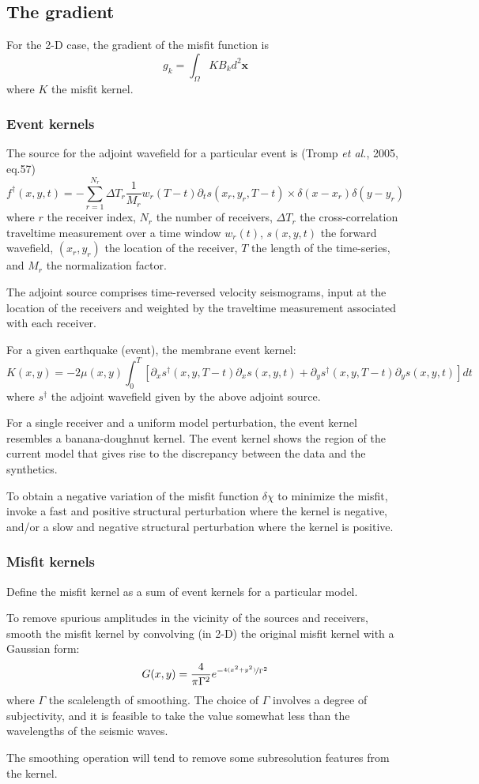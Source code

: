 \documentclass{article}
\newcommand{\mbf}[1]{\mathbf{#1}}
\newcommand{\etal}{\textit{et al.}}
\begin{document}
\subsection{The gradient}
For the 2-D case, the gradient of the misfit function is
\[ g_k=\int_\Omega KB_kd^2\mbf x \]
where $K$ the misfit kernel.\par
\subsubsection{Event kernels}
The source for the adjoint wavefield for a particular event is (Tromp \etal, 2005, eq.57)
\[ f^\dagger(x,y,t)=-\sum_{r=1}^{N_r}\Delta T_r\frac{1}{M_r}w_r(T-t)\partial_ts(x_r,y_r,T-t)\times\delta(x-x_r)\delta(y-y_r) \]
where $r$ the receiver index, $N_r$ the number of receivers, $\Delta T_r$ the cross-correlation traveltime measurement over a time window $w_r(t)$, $s(x,y,t)$ the forward wavefield, $(x_r,y_r)$ the location of the receiver, $T$ the length of the time-series, and $M_r$ the normalization factor.\par
The adjoint source comprises time-reversed velocity seismograms, input at the location of the receivers and weighted by the traveltime measurement associated with each receiver.\par
For a given earthquake (event), the membrane event kernel:
\[ K(x,y)=-2\mu(x,y)\int_0^T[\partial_xs^\dagger(x,y,T-t)\partial_xs(x,y,t)+\partial_ys^\dagger(x,y,T-t)\partial_ys(x,y,t)]dt \]
where $s^\dagger$ the adjoint wavefield given by the above adjoint source.\par
For a single receiver and a uniform model perturbation, the event kernel resembles a banana-doughnut kernel. The event kernel shows the region of the current model that gives rise to the discrepancy between the data and the synthetics.\par
To obtain a negative variation of the misfit function $\delta\chi$ to minimize the misfit, invoke a fast and positive structural perturbation where the kernel is negative, and/or a slow and negative structural perturbation where the kernel is positive.\par
\subsubsection{Misfit kernels}
Define the misfit kernel as a sum of event kernels for a particular model.\par
To remove spurious amplitudes in the vicinity of the sources and receivers, smooth the misfit kernel by convolving (in 2-D) the original misfit kernel with a Gaussian form:
\[ G(x,y)=\frac{4}{\pi\Gamma^2}e^{-\nicefrac{4(x^2+y^2)}{\Gamma^2}} \]
where $\Gamma$ the scalelength of smoothing. The choice of $\Gamma$ involves a degree of subjectivity, and it is feasible to take the value somewhat less than the wavelengths of the seismic waves.\par
The smoothing operation will tend to remove some subresolution features from the kernel.\par
\end{document}

